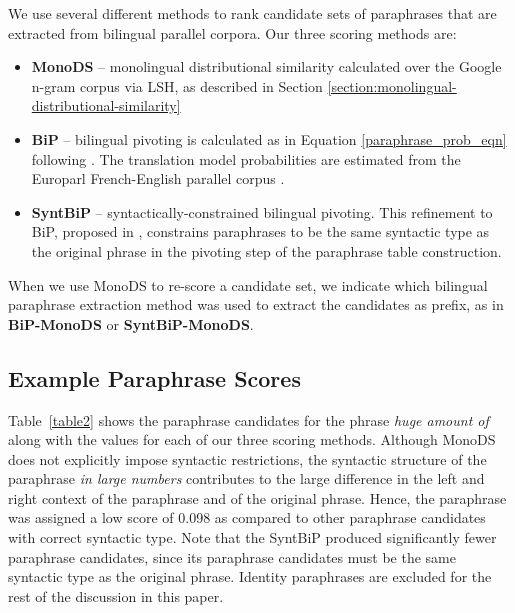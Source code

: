 \documentclass[11pt]{article}
\begin{document}
We use several different methods to rank candidate sets of paraphrases that are extracted from bilingual parallel corpora.  Our three scoring methods are: 
\begin{itemize}
\item {\bf MonoDS} -- monolingual distributional similarity calculated over the Google n-gram corpus via LSH,
 as described in Section \ref{section:monolingual-distributional-similarity}
\item {\bf BiP} -- bilingual pivoting is calculated as in Equation \ref{paraphrase_prob_eqn} following .  The translation model probabilities are estimated from the  Europarl French-English parallel corpus \cite{Koehn05}.
\item {\bf SyntBiP} -- syntactically-constrained bilingual pivoting.  This refinement to BiP, proposed in  , constrains paraphrases to be the same syntactic type as the original phrase in the pivoting step of the paraphrase table construction.
\end{itemize}
When we use MonoDS to re-score a candidate set, we indicate which bilingual paraphrase extraction method was used to extract the candidates as prefix, as in {\bf BiP-MonoDS} or {\bf SyntBiP-MonoDS}.


\subsection{Example Paraphrase Scores}

Table~\ref{table2} shows the paraphrase candidates for the phrase {\em huge amount of} along with the values for each of our three scoring methods. Although MonoDS does not explicitly impose syntactic restrictions, the syntactic structure of the paraphrase {\em in large numbers} contributes to the large difference in the left and right context of the paraphrase and of the original phrase. Hence, the paraphrase was assigned a low score of 0.098 as compared to other paraphrase candidates with correct syntactic type. Note that the SyntBiP produced significantly fewer paraphrase candidates, since its paraphrase candidates must be the same syntactic type as the original phrase. Identity paraphrases are excluded for the rest of the discussion in this paper.
\end{document}
